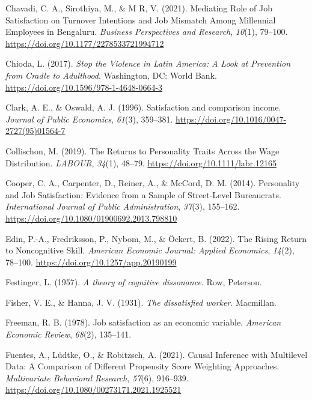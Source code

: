 \documentclass[
]{interact}
\newlength{\cslhangindent}
\newenvironment{CSLReferences}[2] %
 {\begin{list}{}{%
  \setlength{\itemindent}{0pt}
  \setlength{\leftmargin}{0pt}
  \setlength{\parsep}{0pt}
  \ifodd #1
   \setlength{\leftmargin}{\cslhangindent}
   \setlength{\itemindent}{-1\cslhangindent}
  \fi
  \setlength{\itemsep}{#2\baselineskip}}}
 {\end{list}}
\begin{document}
\begin{CSLReferences}{1}{0}
Chavadi, C. A., Sirothiya, M., \& M R, V. (2021). Mediating Role of Job
Satisfaction on Turnover Intentions and Job Mismatch Among Millennial
Employees in Bengaluru. \emph{Business Perspectives and Research},
\emph{10}(1), 79--100. \url{https://doi.org/10.1177/2278533721994712}

Chioda, L. (2017). \emph{Stop the Violence in Latin America: A Look at
Prevention from Cradle to Adulthood}. Washington, DC: World Bank.
\url{https://doi.org/10.1596/978-1-4648-0664-3}

Clark, A. E., \& Oswald, A. J. (1996). Satisfaction and comparison
income. \emph{Journal of Public Economics}, \emph{61}(3), 359--381.
\url{https://doi.org/10.1016/0047-2727(95)01564-7}

Collischon, M. (2019). The Returns to Personality Traits Across the Wage
Distribution. \emph{LABOUR}, \emph{34}(1), 48--79.
\url{https://doi.org/10.1111/labr.12165}

Cooper, C. A., Carpenter, D., Reiner, A., \& McCord, D. M. (2014).
Personality and Job Satisfaction: Evidence from a Sample of Street-Level
Bureaucrats. \emph{International Journal of Public Administration},
\emph{37}(3), 155--162.
\url{https://doi.org/10.1080/01900692.2013.798810}

Edin, P.-A., Fredriksson, P., Nybom, M., \& Öckert, B. (2022). The
Rising Return to Noncognitive Skill. \emph{American Economic Journal:
Applied Economics}, \emph{14}(2), 78--100.
\url{https://doi.org/10.1257/app.20190199}

Festinger, L. (1957). \emph{A theory of cognitive dissonance}. Row,
Peterson.

Fisher, V. E., \& Hanna, J. V. (1931). \emph{The dissatisfied worker}.
Macmillan.

Freeman, R. B. (1978). Job satisfaction as an economic variable.
\emph{American Economic Review}, \emph{68}(2), 135--141.

Fuentes, A., Lüdtke, O., \& Robitzsch, A. (2021). Causal Inference with
Multilevel Data: A Comparison of Different Propensity Score Weighting
Approaches. \emph{Multivariate Behavioral Research}, \emph{57}(6),
916--939. \url{https://doi.org/10.1080/00273171.2021.1925521}


\end{CSLReferences}
\end{document}
